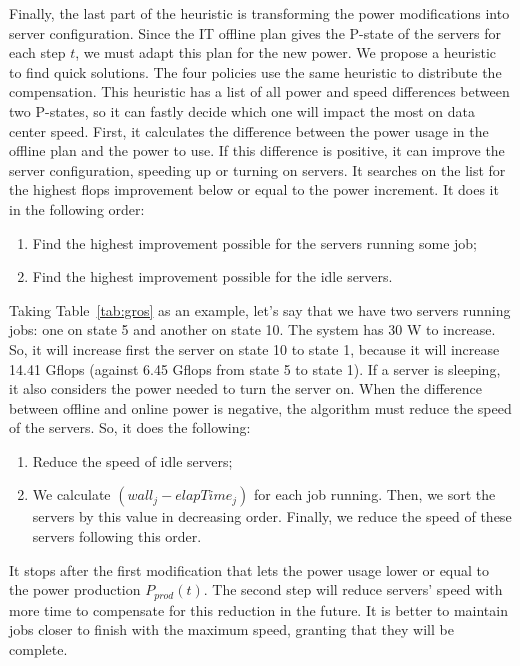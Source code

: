 Finally, the last part of the heuristic is transforming the power modifications into server configuration. Since the IT offline plan gives the P-state of the servers for each step $t$, we must adapt this plan for the new power. We propose a heuristic to find quick solutions. The four policies use the same heuristic to distribute the compensation. This heuristic has a list of all power and speed differences between two P-states, so it can fastly decide which one will impact the most on data center speed. First, it calculates the difference between the power usage in the offline plan and the power to use. If this difference is positive, it can improve the server configuration, speeding up or turning on servers. It searches on the list for the highest flops improvement below or equal to the power increment. It does it in the following order:
\begin{enumerate}
    \item Find the highest improvement possible for the servers running some job;
    \item Find the highest improvement possible for the idle servers.
\end{enumerate}

Taking Table~\ref{tab:gros} as an example, let's say that we have two servers running jobs: one on state 5 and another on state 10. The system has 30 W to increase. So, it will increase first the server on state 10 to state 1, because it will increase 14.41 Gflops (against 6.45 Gflops from state 5 to state 1). If a server is sleeping, it also considers the power needed to turn the server on. When the difference between offline and online power is negative, the algorithm must reduce the speed of the servers. So, it does the following:
\begin{enumerate}
    \item Reduce the speed of idle servers;
    \item We calculate $(wall_{j} - elapTime_{j})$ for each job running. Then, we sort the servers by this value in decreasing order. Finally, we reduce the speed of these servers following this order. 
\end{enumerate}

It stops after the first modification that lets the power usage lower or equal to the power production $P_{prod}(t)$. The second step will reduce servers' speed with more time to compensate for this reduction in the future. It is better to maintain jobs closer to finish with the maximum speed, granting that they will be complete.

